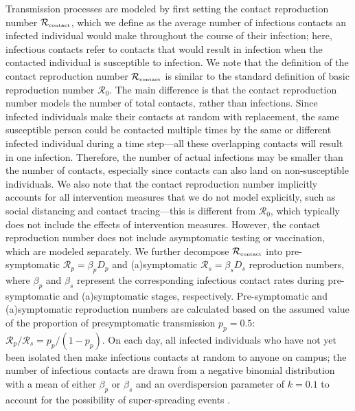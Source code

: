 \documentclass[12pt]{article}
\newcommand{\Rx}[1]{\ensuremath{{\mathcal R}_{#1}}}
\newcommand{\Rc}{\Rx{\textrm{\tiny{contact}}}}
\newcommand{\RR}{\ensuremath{{\mathcal R}}}
\begin{document}
Transmission processes are modeled by first setting the contact reproduction number $\Rc$, which we define as the average number of infectious contacts an infected individual would make throughout the course of their infection;
here, infectious contacts refer to contacts that would result in infection when the contacted individual is susceptible to infection.
We note that the definition of the contact reproduction number $\Rc$ is similar to the standard definition of basic reproduction number $\RR_0$.
The main difference is that the contact reproduction number models the number of total contacts, rather than infections. 
Since infected individuals make their contacts at random with replacement, the same susceptible person could be contacted multiple times by the same or different infected individual during a time step---all these overlapping contacts will result in one infection.
Therefore, the number of actual infections may be smaller than the number of contacts, especially since contacts can also land on non-susceptible individuals.
We also note that the contact reproduction number implicitly accounts for all intervention measures that we do not model explicitly, such as social distancing and contact tracing---this is different from $\RR_0$, which typically does not include the effects of intervention measures.
However, the contact reproduction number does not include asymptomatic testing or vaccination, which are modeled separately.
We further decompose $\Rc$ into pre-symptomatic $\mathcal R_p = \beta_p D_p$ and (a)symptomatic $\mathcal R_s = \beta_s D_s$ reproduction numbers, where $\beta_p$ and $\beta_s$ represent the corresponding infectious contact rates during pre-symptomatic and (a)symptomatic stages, respectively. Pre-symptomatic and (a)symptomatic reproduction numbers are calculated based on the assumed value of the proportion of presymptomatic transmission $p_p = 0.5$: $\mathcal R_p/\mathcal R_s = p_p/(1 - p_p)$.
On each day, all infected individuals who have not yet been isolated then make infectious contacts at random to anyone on campus; the number of infectious contacts are drawn from a negative binomial distribution with a mean of either $\beta_p$ or $\beta_s$ and an overdispersion parameter of $k=0.1$ to account for the possibility of super-spreading events \citep{10.12688/wellcomeopenres.15842.3}.
\end{document}
